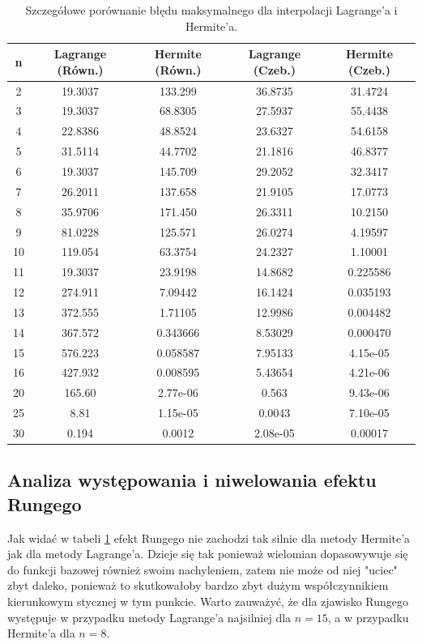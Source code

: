 \documentclass{article}
\begin{document}
\begin{table}[htbp]
\centering
\caption{Szczegółowe porównanie błędu maksymalnego dla interpolacji Lagrange'a i Hermite'a.}
\label{tab:max_full_runge}
\begin{tabular}{@{}ccccc@{}}
\toprule
\textbf{n} & \textbf{Lagrange (Równ.)} & \textbf{Hermite (Równ.)} & \textbf{Lagrange (Czeb.)} & \textbf{Hermite (Czeb.)} \\ \midrule
2  & 19.3037  & 133.299   & 36.8735  & 31.4724   \\
3  & 19.3037  & 68.8305   & 27.5937  & 55.4438   \\
4  & 22.8386  & 48.8524   & 23.6327  & 54.6158   \\
5  & 31.5114  & 44.7702   & 21.1816  & 46.8377   \\
6  & 19.3037  & 145.709   & 29.2052  & 32.3417   \\
7  & 26.2011  & 137.658   & 21.9105  & 17.0773   \\
8  & 35.9706  & 171.450   & 26.3311  & 10.2150   \\
9  & 81.0228  & 125.571   & 26.0274  & 4.19597   \\
10 & 119.054  & 63.3754   & 24.2327  & 1.10001   \\
11 & 19.3037  & 23.9198   & 14.8682  & 0.225586  \\
12 & 274.911  & 7.09442   & 16.1424  & 0.035193  \\
13 & 372.555  & 1.71105   & 12.9986  & 0.004482  \\
14 & 367.572  & 0.343666  & 8.53029  & 0.000470  \\
15 & 576.223  & 0.058587  & 7.95133  & 4.15e-05  \\
16 & 427.932  & 0.008595  & 5.43654  & 4.21e-06  \\ \bottomrule
20 & 165.60   & 2.77e-06  & 0.563    & 9.43e-06  \\
25 & 8.81     & 1.15e-05  & 0.0043   & 7.10e-05  \\
30 & 0.194    & 0.0012    & 2.08e-05 & 0.00017   \\ \bottomrule
\end{tabular}
\end{table}


\subsection{Analiza występowania i niwelowania efektu Rungego}

Jak widać w tabeli \ref{tab:max_full_runge} efekt Rungego nie zachodzi tak silnie dla metody Hermite'a jak dla metody Lagrange'a. Dzieje się tak ponieważ wielomian
dopasowywuje się do funkcji bazowej również swoim nachyleniem, zatem nie może od niej "uciec" zbyt daleko, ponieważ to skutkowałoby bardzo zbyt dużym współczynnikiem
kierunkowym stycznej w tym punkcie. Warto zauważyć, że dla zjawisko Rungego występuje w przypadku metody Lagrange'a najsilniej dla $n = 15$, a w przypadku Hermite'a
dla $n=8$.
\end{document}
